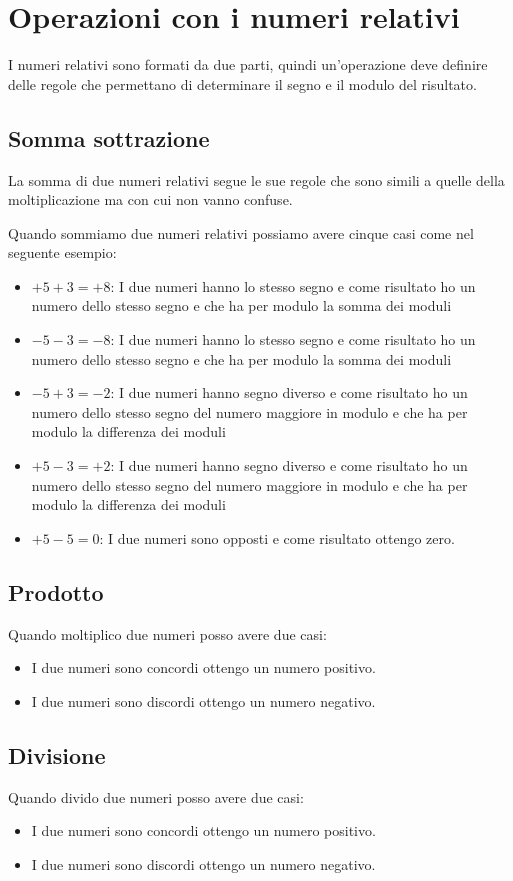 \section{Operazioni con i numeri relativi}
\label{sec:Operazioniconnumerirelativi}
I numeri relativi sono formati da due parti, quindi un'operazione deve definire delle regole che permettano di determinare il segno e il modulo del risultato.
\subsection{Somma sottrazione}
La somma di due numeri relativi segue le sue regole che sono simili a quelle della moltiplicazione ma con cui non vanno confuse.

Quando sommiamo due numeri relativi possiamo avere cinque casi come nel seguente esempio:
\begin{itemize}
	\item $+5+3=+8$: I due numeri hanno lo stesso segno e come risultato ho un numero dello stesso segno e che ha per modulo la somma dei moduli
	\item $-5-3=-8$: I due numeri hanno lo stesso segno e come risultato ho un numero dello stesso segno e che ha per modulo la somma dei moduli
	\item $-5+3=-2$: I due numeri hanno segno diverso e come risultato ho un numero dello stesso segno del numero maggiore in modulo e che ha per modulo la differenza dei moduli
	\item $+5-3=+2$: I due numeri hanno segno diverso e come risultato ho un numero dello stesso segno del numero maggiore in modulo e che ha per modulo la differenza dei moduli
	\item $+5-5=0$: I due numeri sono opposti e come risultato ottengo zero.
\end{itemize}
\subsection{Prodotto}
Quando moltiplico due numeri posso avere due casi:
\begin{itemize}
	\item I due numeri sono concordi ottengo un numero positivo.
	\item I due numeri sono discordi ottengo un numero negativo.
\end{itemize}
\subsection{Divisione}
Quando divido due numeri posso avere due casi:
\begin{itemize}
	\item I due numeri sono concordi ottengo un numero positivo.
	\item I due numeri sono discordi ottengo un numero negativo.
\end{itemize}
